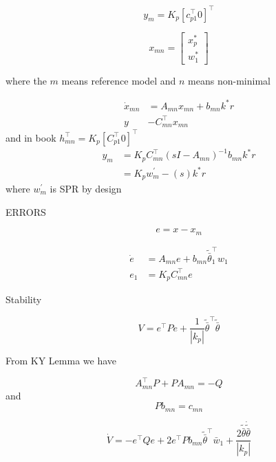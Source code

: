 \begin{equation*}
  y_{m}=K_{p}[c_{p1}^{\top} 0]^{\top}
\end{equation*}

\begin{equation*}
  x_{mn}=
  \begin{bmatrix}
    x_{p}^{*} \\ w_{1}^{*}
  \end{bmatrix}
\end{equation*}

where the $m$ means reference model and $n$ means non-minimal

\begin{align*}
  \dot{x}_{mn}&=A_{mn}x_{mn}+b_{mn}k^{*}r \\
  y&-C_{mn}^{\top}x_{mn}
\end{align*}
and in book $h_{mn}^{\top}=K_{p}[C_{p1}^{\top} 0]^{\top}$
\begin{align*}
  y_{m}&=K_{p}C_{mn}^{\top}(sI-A_{mn})^{-1}b_{mn}k^{*}r \\
  &=K_{p}w_{m}^{\prime}-(s)k^{*}r
\end{align*}
where $w_{m}^{\prime}$ is SPR by design

ERRORS

\begin{equation*}
  e=x-x_{m}
\end{equation*}

\begin{align*}
  \dot{e}&=A_{mn}e+b_{mn}\tilde{\bar{\theta}}_{1}^{\top}w_{1} \\
  e_{1}&=K_{p}C_{mn}^{\top}e
\end{align*}

Stability

\begin{equation*}
  V=e^{\top}Pe+\frac{1}{|k_{p}|}\tilde{\bar{\theta}}^{\top}\tilde{\bar{\theta}}
\end{equation*}

From KY Lemma we have

\begin{equation*}
  A_{mn}^{\top}P+PA_{mn}=-Q
\end{equation*}
and
\begin{equation*}
  Pb_{mn}=c_{mn}
\end{equation*}

\begin{equation*}
  \dot{V}=-e^{\top}Qe+2e^{\top}Pb_{mn}\tilde{\bar{\theta}}^{\top}\bar{w}_{1}+\frac{2\tilde{\bar{\theta}}\dot{\tilde{\bar{\theta}}}}{|k_{p}|}
\end{equation*}

